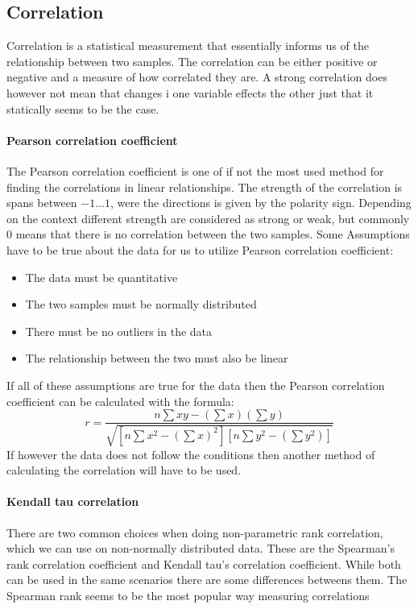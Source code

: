 \subsection{Correlation}
Correlation is a statistical measurement that essentially informs us of the relationship between two samples. The correlation can be either positive or negative and a measure of how correlated they are. A strong correlation does however not mean that changes i one variable effects the other just that it statically seems to be the case.
\paragraph{Pearson correlation coefficient} The Pearson correlation coefficient is one of if not the most used method for finding the correlations in linear relationships. The strength of the correlation is spans between $-1 \dotsc 1$, were the directions is given by the polarity sign. Depending on the context different strength are considered as strong or weak, but commonly 0 means that there is no correlation between the two samples. Some Assumptions have to be true about the data for us to utilize Pearson correlation coefficient:
\begin{itemize}
    \item The data must be quantitative
    \item The two samples must be normally distributed
    \item There must be no outliers in the data
    \item The relationship between the two must also be linear
\end{itemize}
If all of these assumptions are true for the data then the Pearson correlation coefficient can be calculated with the formula:
$$r=\frac{n\sum{xy- (\sum{x})(\sum{y})}}{\sqrt{[n\sum{x^2}-(\sum{x})^2][n\sum{y^2}-(\sum{y}^2)]}}$$
If however the data does not follow the conditions then another method of calculating the correlation will have to be used. 
\paragraph{Kendall tau correlation}
There are two common choices when doing non-parametric rank correlation, which we can use on non-normally distributed data. These are the Spearman's rank correlation coefficient and Kendall tau's correlation coefficient. While both can be used in the same scenarios there are some differences betweens them. The Spearman rank seems to be the most popular way measuring correlations